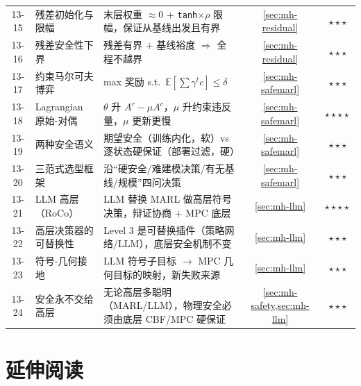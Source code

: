 \begin{table}[H]
\begin{tabular}{cp{3.6cm}p{6.0cm}cc}
13-15 & 残差初始化与限幅 & 末层权重 $\approx0$ $+$ \texttt{tanh}$\times\rho$ 限幅，保证从基线出发且有界 & \cref{sec:mh-residual} & $\star\star\star$ \\
13-16 & 残差安全性下界 & 残差有界 $+$ 基线裕度 $\Rightarrow$ 全程不越界 & \cref{sec:mh-residual} & $\star\star\star$ \\
13-17 & 约束马尔可夫博弈 & max 奖励 s.t.\ $\mathbb{E}[\sum\gamma^tc]\le\delta$ & \cref{sec:mh-safemarl} & $\star\star\star$ \\
13-18 & Lagrangian 原始-对偶 & $\theta$ 升 $A^r-\mu A^c$，$\mu$ 升约束违反量，$\mu$ 更新更慢 & \cref{sec:mh-safemarl} & $\star\star\star\star$ \\
13-19 & 两种安全语义 & 期望安全（训练内化，软）vs 逐状态硬保证（部署过滤，硬） & \cref{sec:mh-safemarl} & $\star\star\star$ \\
13-20 & 三范式选型框架 & 沿“硬安全/难建模决策/有无基线/规模”四问决策 & \cref{sec:mh-safemarl} & $\star\star\star$ \\
13-21 & LLM 高层（RoCo） & LLM 替换 MARL 做高层符号决策，辩证协商 $+$ MPC 底层 & \cref{sec:mh-llm} & $\star\star\star\star$ \\
13-22 & 高层决策器的可替换性 & Level 3 是可替换插件（策略网络/LLM），底层安全机制不变 & \cref{sec:mh-llm} & $\star\star\star$ \\
13-23 & 符号-几何接地 & LLM 符号子目标 $\to$ MPC 几何目标的映射，新失败来源 & \cref{sec:mh-llm} & $\star\star\star$ \\
13-24 & 安全永不交给高层 & 无论高层多聪明（MARL/LLM），物理安全必须由底层 CBF/MPC 硬保证 & \cref{sec:mh-safety,sec:mh-llm} & $\star\star\star$ \\
\bottomrule
\end{tabular}
\end{table}

\section*{延伸阅读}

